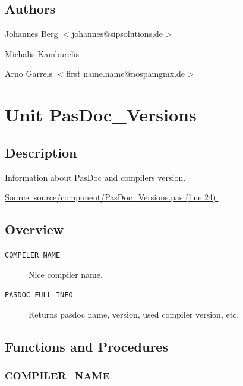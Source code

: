 \documentclass{report}
\newif\ifpdf
\begin{document}
\section{Authors}
\par
Johannes Berg {$<$}johannes@sipsolutions.de{$>$}

\par
Michalis Kamburelis

\par
Arno Garrels {$<$}first name.name@nospamgmx.de{$>$}

\chapter{Unit PasDoc{\_}Versions}
\label{PasDoc_Versions}
\section{Description}
Information about PasDoc and compilers version.\par
\href{https://github.com/pasdoc/pasdoc/blob/master/source/component/PasDoc_Versions.pas#L24}{Source: source/component/PasDoc{\_}Versions.pas (line 24).}
\section{Overview}
\begin{description}
\item[\texttt{COMPILER{\_}NAME}]Nice compiler name.
\item[\texttt{PASDOC{\_}FULL{\_}INFO}]Returns pasdoc name, version, used compiler version, etc.
\end{description}
\section{Functions and Procedures}
\ifpdf
\subsection*{\large{\textbf{COMPILER{\_}NAME}}\normalsize\hspace{1ex}\hrulefill}
\else
\end{document}
